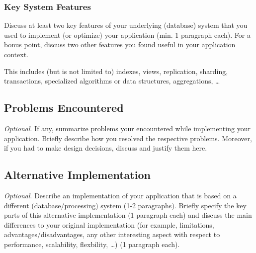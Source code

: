 \subsubsection{Key System Features}

Discuss at least two key features of your underlying (database) system that you
used to implement (or optimize) your application (min. 1 paragraph each). For
a bonus point, discuss two other features you found useful in your application
context.

This includes (but is not limited to) indexes, views, replication, sharding,
transactions, specialized algorithms or data structures, aggregations, \ldots

\subsection{Problems Encountered}

\emph{Optional}. If any, summarize problems your encountered while implementing
your application. Briefly describe how you resolved the respective problems.
Moreover, if you had to make design decisions, discuss and justify them here.

\subsection{Alternative Implementation}

\emph{Optional}. Describe an implementation of your application that is based on
a different (database/processing) system (1-2 paragraphs). Briefly specify the
key parts of this alternative implementation (1 paragraph each) and discuss the
main differences to your original implementation (for example, limitations,
advantages/disadvantages, any other interesting aspect with respect to
performance, scalability, flexbility, \ldots) (1 paragraph each).
